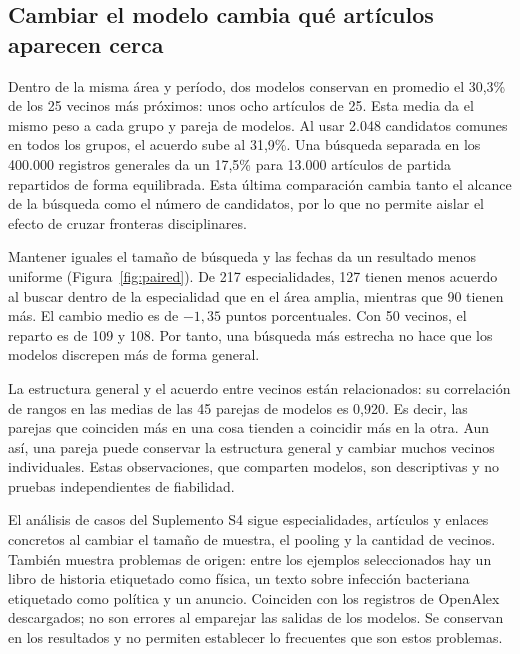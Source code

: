 \subsection{Cambiar el modelo cambia qué artículos aparecen cerca}
Dentro de la misma área y período, dos modelos conservan en promedio el 30,3\% de los 25 vecinos más próximos: unos ocho artículos de 25. Esta media da el mismo peso a cada grupo y pareja de modelos. Al usar 2.048 candidatos comunes en todos los grupos, el acuerdo sube al 31,9\%. Una búsqueda separada en los 400.000 registros generales da un 17,5\% para 13.000 artículos de partida repartidos de forma equilibrada. Esta última comparación cambia tanto el alcance de la búsqueda como el número de candidatos, por lo que no permite aislar el efecto de cruzar fronteras disciplinares.

Mantener iguales el tamaño de búsqueda y las fechas da un resultado menos uniforme (Figura~\ref{fig:paired}). De 217 especialidades, 127 tienen menos acuerdo al buscar dentro de la especialidad que en el área amplia, mientras que 90 tienen más. El cambio medio es de $-1,35$ puntos porcentuales. Con 50 vecinos, el reparto es de 109 y 108. Por tanto, una búsqueda más estrecha no hace que los modelos discrepen más de forma general.

La estructura general y el acuerdo entre vecinos están relacionados: su correlación de rangos en las medias de las 45 parejas de modelos es 0,920. Es decir, las parejas que coinciden más en una cosa tienden a coincidir más en la otra. Aun así, una pareja puede conservar la estructura general y cambiar muchos vecinos individuales. Estas observaciones, que comparten modelos, son descriptivas y no pruebas independientes de fiabilidad.

El análisis de casos del Suplemento S4 sigue especialidades, artículos y enlaces concretos al cambiar el tamaño de muestra, el pooling y la cantidad de vecinos. También muestra problemas de origen: entre los ejemplos seleccionados hay un libro de historia etiquetado como física, un texto sobre infección bacteriana etiquetado como política y un anuncio. Coinciden con los registros de OpenAlex descargados; no son errores al emparejar las salidas de los modelos. Se conservan en los resultados y no permiten establecer lo frecuentes que son estos problemas.

